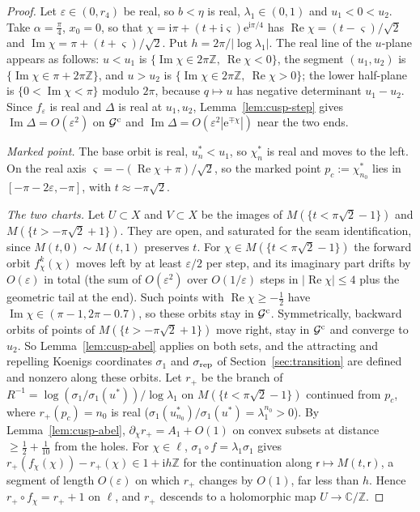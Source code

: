 \documentclass[11pt]{amsart}
\theoremstyle{definition}
\newcommand{\Rr}{R}
\newcommand{\eee}{\mathrm{e}}
\newcommand{\ii}{\mathrm{i}}
\begin{document}
\begin{proof}
Let $\varepsilon\in(0,r_4)$ be real, so $b<\eta$ is real, $\lambda_1\in(0,1)$ and $u_1<0<u_2$.
Take $\alpha=\tfrac\pi4$, $x_0=0$, so that
$\chi=\ii\pi+(t+\ii\varsigma)\eee^{\ii\pi/4}$ has
$\operatorname{Re}\chi=(t-\varsigma)/\sqrt2$ and $\operatorname{Im}\chi=\pi+(t+\varsigma)/\sqrt2$.  Put
$h=2\pi/|\log\lambda_1|$.  The real line of the $u$-plane appears as follows:
$u<u_1$ is $\{\operatorname{Im}\chi\in2\pi\mathbb Z,\ \operatorname{Re}\chi<0\}$, the segment
$(u_1,u_2)$ is $\{\operatorname{Im}\chi\in\pi+2\pi\mathbb Z\}$, and $u>u_2$ is
$\{\operatorname{Im}\chi\in2\pi\mathbb Z,\ \operatorname{Re}\chi>0\}$; the lower half-plane is
$\{0<\operatorname{Im}\chi<\pi\}$ modulo $2\pi$, because $q\mapsto u$ has negative determinant
$u_1-u_2$.  Since $f_\varepsilon$ is real and $\Delta$ is real at $u_1,u_2$,
Lemma~\ref{lem:cusp-step} gives $\operatorname{Im}\Delta=O(\varepsilon^2)$ on $\mathcal G^{\rm c}$ and
$\operatorname{Im}\Delta=O(\varepsilon^2|\eee^{\mp\chi}|)$ near the two ends.

\emph{Marked point.}  The base orbit is real, $u^*_n<u_1$, so $\chi^*_n$ is real and
moves to the left.  On the real axis $\varsigma=-(\operatorname{Re}\chi+\pi)/\sqrt2$, so the marked
point $p_c:=\chi^*_{n_0}$ lies in $[-\pi-2\varepsilon,-\pi]$, with $t\approx-\pi\sqrt2$.

\emph{The two charts.}  Let $U\subset X$ and $V\subset X$ be the images of
$M(\{t<\pi\sqrt2-1\})$ and $M(\{t>-\pi\sqrt2+1\})$.  They are open, and saturated
for the seam identification, since $M(t,0)\sim M(t,1)$ preserves $t$.  For
$\chi\in M(\{t<\pi\sqrt2-1\})$ the forward orbit $f_\chi^k(\chi)$ moves left by at least
$\varepsilon/2$ per step, and its imaginary part drifts by $O(\varepsilon)$ in total (the sum
of $O(\varepsilon^2)$ over $O(1/\varepsilon)$ steps in $|\operatorname{Re}\chi|\le4$ plus the geometric tail
at the end).  Such points with $\operatorname{Re}\chi\ge-\tfrac12$ have
$\operatorname{Im}\chi\in(\pi-1,2\pi-0.7)$, so these orbits stay in $\mathcal G^{\rm c}$.
Symmetrically, backward orbits of points of $M(\{t>-\pi\sqrt2+1\})$ move right,
stay in $\mathcal G^{\rm c}$ and converge to $u_2$.  So Lemma~\ref{lem:cusp-abel} applies
on both sets, and the attracting and repelling Koenigs coordinates $\sigma_1$ and
$\sigma_{\rm rep}$ of Section~\ref{sec:transition} are defined and nonzero along these orbits.
Let $r_+$ be the branch of $\Rr^{-1}=\log(\sigma_1/\sigma_1(u^*))/\log\lambda_1$ on
$M(\{t<\pi\sqrt2-1\})$ continued from $p_c$, where $r_+(p_c)=n_0$ is real
($\sigma_1(u^*_{n_0})/\sigma_1(u^*)=\lambda_1^{n_0}>0$).  By Lemma~\ref{lem:cusp-abel},
$\partial_\chi r_+=A_1+O(1)$ on convex subsets at distance $\ge\tfrac12+\tfrac1{10}$ from the holes.  For
$\chi\in\ell$, $\sigma_1\circ f=\lambda_1\sigma_1$ gives $r_+(f_\chi(\chi))-r_+(\chi)\in1+\ii h\mathbb Z$ for the
continuation along $\mathsf r\mapsto M(t,\mathsf r)$, a segment of length $O(\varepsilon)$ on which $r_+$
changes by $O(1)$, far less than $h$.  Hence $r_+\circ f_\chi=r_++1$ on $\ell$, and $r_+$
descends to a holomorphic map $U\to\mathbb C/\mathbb Z$.


\end{proof}
\end{document}
